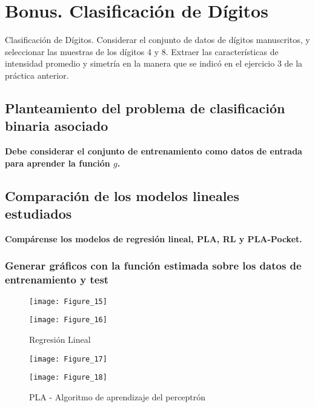 \chapter{Bonus. Clasificación de Dígitos}

Clasificación de Dígitos. Considerar el conjunto de datos de dígitos
manuscritos, y seleccionar las muestras de los dígitos 4 y 8. 
Extraer las características de intensidad promedio y simetría en la
manera que se indicó en el ejercicio 3 de la práctica anterior.

\section{Planteamiento del problema de clasificación binaria asociado}

\textbf{Debe considerar el conjunto de entrenamiento como datos de entrada para aprender
la función $g$.}

\section{Comparación de los modelos lineales estudiados}

\textbf{Compárense los modelos de regresión lineal, PLA, RL y PLA-Pocket.}

\subsection{Generar gráficos con la función estimada sobre los datos de entrenamiento y test}

\begin{figure}[H]
    \caption{Regresión Lineal\medskip}
    \begin{minipage}[b]{.5\linewidth}
      \centering
      \texttt{[image: Figure\_15]}
       \label{subfig-5:dummy62}
    \end{minipage}
    \hfill \hfill
    \begin{minipage}[b]{.5\linewidth}
      \centering
      \texttt{[image: Figure\_16]}
    \end{minipage}
    \label{fig:dummy62}
\end{figure}

\begin{figure}[H]
    \caption{PLA - Algoritmo de aprendizaje del perceptrón\medskip}
    \begin{minipage}[b]{.5\linewidth}
      \centering
      \texttt{[image: Figure\_17]}
       \label{subfig-5:dummy63}
    \end{minipage}
    \hfill \hfill
    \begin{minipage}[b]{.5\linewidth}
      \centering
      \texttt{[image: Figure\_18]}
    \end{minipage}
    \label{fig:dummy63}
\end{figure}

